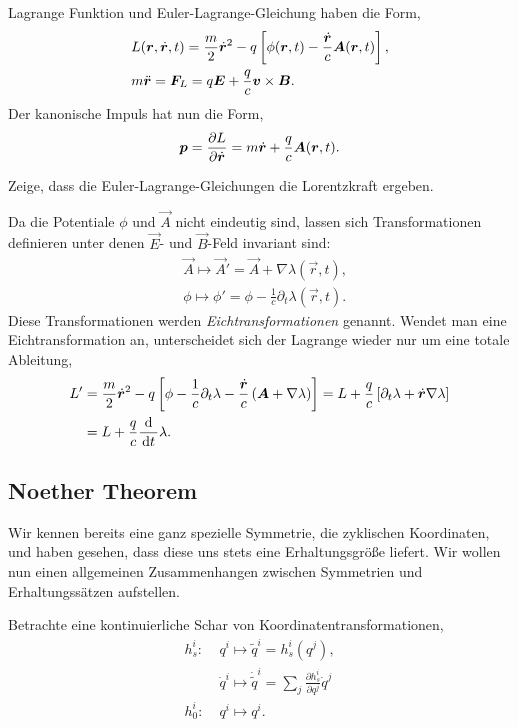 Lagrange Funktion und Euler-Lagrange-Gleichung haben die Form,
\begin{align*}
&L(\bm{r},\dot{\bm{r}},t) = \frac{m}{2}\dot{\bm{r}}^2 - q\left[\phi(\bm{r},t) -
\frac{\dot{\bm{r}}}{c}\bm{A}(\bm{r},t) \right],\\
&m\ddot{\bm{r}} = \bm{F}_L = q\bm{E} + \frac{q}{c}\bm{v}\times\bm{B}.
\end{align*}
Der kanonische Impuls hat nun die Form,
\begin{align*}
\bm{p} = \frac{\partial L}{\partial \dot{\bm{r}}} = m\dot{\bm{r}} +
\frac{q}{c}\bm{A}(\bm{r},t).
\end{align*}
\begin{bemn}[Übungsaufgabe:]
Zeige, dass die Euler-Lagrange-Gleichungen die Lorentzkraft ergeben.
\end{bemn}

Da die Potentiale $\phi$ und $\vec{A}$ nicht eindeutig sind, lassen sich
Transformationen definieren unter denen $\vec{E}$- und $\vec{B}$-Feld
invariant sind:
\begin{align*}
&\vec{A}\mapsto \vec{A}' = \vec{A} + \nabla \lambda(\vec{r},t),\\
&\phi\mapsto \phi' = \phi - \frac{1}{c}\partial_t \lambda(\vec{r},t).
\end{align*}
Diese Transformationen werden \emph{Eichtransformationen} genannt. Wendet man
eine Eichtransformation an, unterscheidet sich der Lagrange wieder nur um eine
totale Ableitung,
\begin{align*}
L' &= \frac{m}{2}\dot{\bm{r}}^2 - q\left[\phi - \frac{1}{c}\partial_t \lambda -
\frac{\dot{\bm{r}}}{c}\left(\bm{A} + \nabla\lambda\right)\right]
= L + \frac{q}{c}\left[\partial_t \lambda + \dot{\bm{r}}\nabla\lambda \right] \\ 
&=L+ \frac{q}{c}\frac{\mathrm{d}}{\,\mathrm{d} t\,}\lambda.
\end{align*}

\subsection{Noether Theorem}

Wir kennen bereits eine ganz spezielle Symmetrie, die zyklischen Koordinaten,
und haben gesehen, dass diese uns stets eine Erhaltungsgröße liefert. Wir
wollen nun einen allgemeinen Zusammenhangen zwischen Symmetrien und
Erhaltungssätzen aufstellen.

Betrachte eine kontinuierliche Schar von Koordinatentransformationen,
\begin{align*}
h_s^i:\; &q^i \mapsto \tilde{q}^i = h_s^i(q^j),\\
&\dot{q}^i \mapsto \dot{\tilde{q}}^i = \sum_j \frac{\partial h_s^i}{\partial
q^j}\dot{q}^j\\
h_0^i:\; &q^i \mapsto q^i.
\end{align*}

